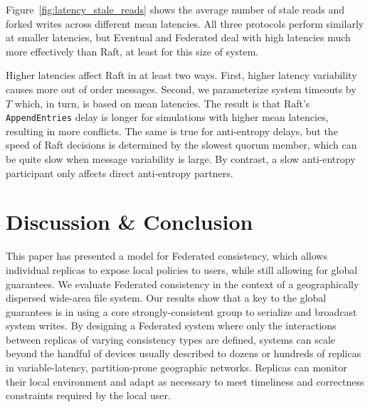\documentclass[10pt,conference,letterpaper]{IEEEtran}
\begin{document}
Figure~\ref{fig:latency_stale_reads} shows
the average number of stale reads and forked writes across different mean
latencies.
All three protocols perform similarly at smaller latencies, but Eventual and
Federated deal with high latencies much more effectively than Raft, at least
for this size of system.

Higher latencies affect Raft in at least two ways.
First, higher latency variability causes more out of order messages.
Second, we parameterize system timeouts by $T$ which, in turn, is based on
mean latencies.
The result is that Raft's \texttt{AppendEntries} delay is longer for
simulations with higher mean latencies, resulting in more conflicts.
The same is true for anti-entropy delays, but the speed of Raft decisions is
determined by the slowest quorum member, which can be quite slow when message
variability is large.
By contrast, a slow anti-entropy participant only affects direct anti-entropy
partners.

\vspace{.5em}
\section{Discussion \& Conclusion}
\label{sec:conclusion}

This paper has presented a model for Federated consistency, which allows individual
replicas to expose local policies to users, while still allowing for global guarantees.
We evaluate Federated consistency in the context of a geographically dispersed wide-area
file system.
Our results show that a key to the global guarantees is in using a core
strongly-consistent group to serialize and broadcast system writes.
By designing a Federated system where only the interactions between replicas of varying
consistency types are defined, systems can scale beyond the handful of devices usually
described to dozens or hundreds of replicas in variable-latency, partition-prone
geographic networks.
Replicas can monitor their local environment and adapt as necessary to meet timeliness and
correctness constraints required by the local user.

%



\end{document}
